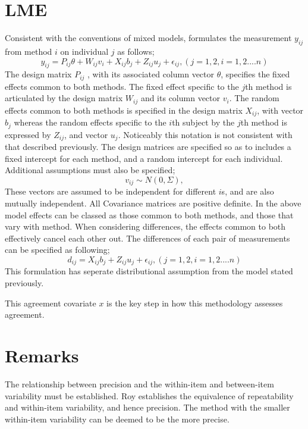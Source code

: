 \documentclass[12pt, a4paper]{report}
\theoremstyle{plain}
\theoremstyle{definition}
\theoremstyle{remark}
\begin{document}
\section{LME}
Consistent with the conventions of mixed models, \citet{pkc}
formulates the measurement $y_{ij} $from method $i$ on individual
$j$ as follows;
\begin{equation}
y_{ij} =P_{ij}\theta + W_{ij}v_{i} + X_{ij}b_{j} + Z_{ij}u_{j} +
\epsilon_{ij},     (j=1,2, i=1,2....n)
\end{equation}
The design matrix $P_{ij}$ , with its associated column vector
$\theta$, specifies the fixed effects common to both methods. The
fixed effect specific to the $j$th method is articulated by the
design matrix $W_{ij}$ and its column vector $v_{i}$. The random
effects common to both methods is specified in the design matrix
$X_{ij}$, with vector $b_{j}$ whereas the random effects specific
to the $i$th subject by the $j$th method is expressed by $Z_{ij}$,
and vector $u_{j}$. Noticeably this notation is not consistent
with that described previously.  The design matrices are specified
so as to includes a fixed intercept for each method, and a random
intercept for each individual. Additional assumptions must also be
specified;
\begin{equation}
v_{ij} \sim N(0,\Sigma),
\end{equation}
These vectors are assumed to be independent for different $i$s,
and are also mutually independent. All Covariance matrices are
positive definite.  In the above model effects can be classed as
those common to both methods, and those that vary with method.
When considering differences, the effects common to both
effectively cancel each other out. The differences of each pair of
measurements can be specified as following;
\begin{equation}
d_{ij} = X_{ij}b_{j} + Z_{ij}u_{j} + \epsilon_{ij},     (j=1,2,
i=1,2....n)
\end{equation}
This formulation has seperate distributional assumption from the
model stated previously.

This agreement covariate $x$ is the key step in how this
methodology assesses agreement.






\section{Remarks}
The relationship between precision and the within-item and between-item variability must be established. Roy establishes the equivalence of repeatability and within-item variability, and hence precision.  The method with the smaller within-item variability can be deemed to be the more precise.
\end{document}
